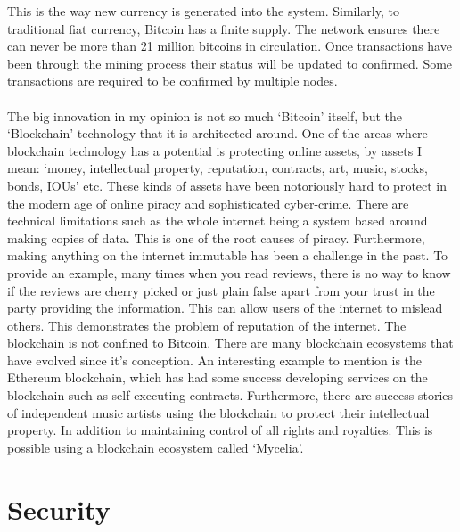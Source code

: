 \documentclass[10pt, a4paper]{report}
\begin{document}
This is the way new currency is generated into the system.
Similarly, to traditional fiat currency, Bitcoin has a finite supply.
The network ensures there can never be more than 21 million bitcoins in circulation.
Once transactions have been through the mining process their status will be updated to confirmed.
Some transactions are required to be confirmed by multiple nodes.
\\\\
The big innovation in my opinion is not so much `Bitcoin' itself, but the `Blockchain' technology
that it is architected around.
One of the areas where blockchain technology has a potential is protecting online assets,
by assets I mean:
`money, intellectual property, reputation, contracts, art, music, stocks, bonds, IOUs' etc.
These kinds of assets have been notoriously hard to protect in the modern age
of online piracy and sophisticated cyber-crime.
There are technical limitations such as the whole internet being a system
based around making copies of data. This is one of the root causes of piracy.
Furthermore, making anything on the internet immutable has been a challenge in
the past. To provide an example, many times when you read reviews, there is no way
to know if the reviews are cherry picked or just plain false apart from your trust in the party providing the information.
This can allow users of the internet to mislead others. This demonstrates the problem
of reputation of the internet. The blockchain is not confined to Bitcoin.
There are many blockchain ecosystems that have evolved since it's conception.
An interesting example to mention is the Ethereum blockchain, which has had some success
developing services on the blockchain such as self-executing contracts.
Furthermore, there are success stories of independent music artists using
the blockchain to protect their intellectual property.
In addition to maintaining control of all rights and royalties.
This is possible using a blockchain ecosystem called `Mycelia'.

\section*{Security}
\end{document}
